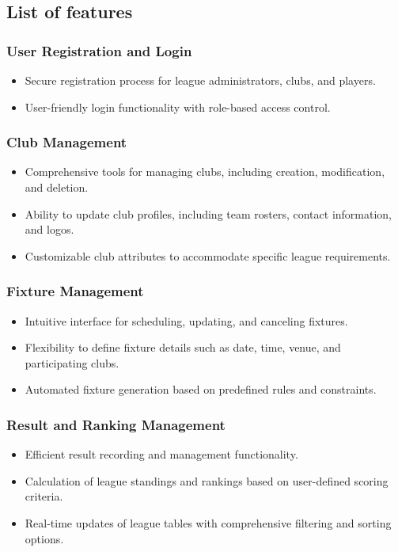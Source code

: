 \documentclass[12pt]{article}
\begin{document}
\subsection{ List of features}
\subsubsection{User Registration and Login}
\begin{itemize}
    \item Secure registration process for league administrators, clubs, and players.
    \item User-friendly login functionality with role-based access control.
\end{itemize}
\subsubsection{Club Management}
\begin{itemize}
    \item Comprehensive tools for managing clubs, including creation, modification, and deletion.
    \item Ability to update club profiles, including team rosters, contact information, and logos.
    \item Customizable club attributes to accommodate specific league requirements.
\end{itemize}

\subsubsection{Fixture Management}
\begin{itemize}
    \item Intuitive interface for scheduling, updating, and canceling fixtures.
    \item Flexibility to define fixture details such as date, time, venue, and participating clubs.
    \item Automated fixture generation based on predefined rules and constraints.
\end{itemize}

\subsubsection{Result and Ranking Management}
\begin{itemize}
    \item Efficient result recording and management functionality.
    \item Calculation of league standings and rankings based on user-defined scoring criteria.
    \item Real-time updates of league tables with comprehensive filtering and sorting options.
\end{itemize}
\end{document}
